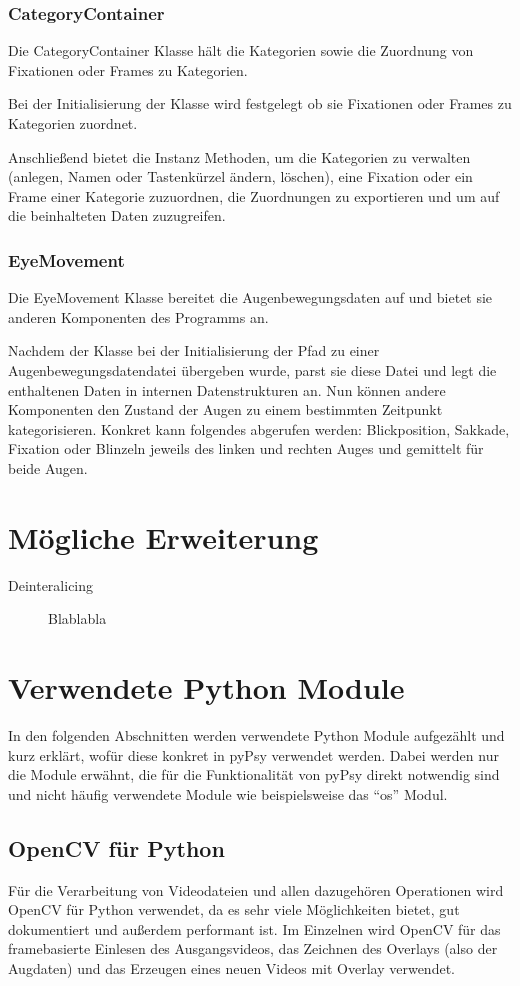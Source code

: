 \documentclass[a4paper,draft]{scrartcl}
\begin{document}
\subsubsection{CategoryContainer}
Die CategoryContainer Klasse hält die Kategorien sowie die Zuordnung von Fixationen oder Frames zu Kategorien.

Bei der Initialisierung der Klasse wird festgelegt ob sie Fixationen oder Frames zu Kategorien zuordnet.

Anschließend bietet die Instanz Methoden, um die Kategorien zu verwalten (anlegen, Namen oder Tastenkürzel ändern, löschen), eine Fixation oder ein Frame einer Kategorie zuzuordnen, die Zuordnungen zu exportieren und um auf die beinhalteten Daten zuzugreifen.

\subsubsection{EyeMovement}
Die EyeMovement Klasse bereitet die Augenbewegungsdaten auf und bietet sie anderen Komponenten des Programms an.

Nachdem der Klasse bei der Initialisierung der Pfad zu einer Augenbewegungsdatendatei übergeben wurde, parst sie diese Datei und legt die enthaltenen Daten in internen Datenstrukturen an. Nun können andere Komponenten den Zustand der Augen zu einem bestimmten Zeitpunkt kategorisieren. Konkret kann folgendes abgerufen werden: Blickposition, Sakkade, Fixation oder Blinzeln jeweils des linken und rechten Auges und gemittelt für beide Augen.

\section{M\"ogliche Erweiterung}
  \begin{description}
    \item[Deinteralicing] Blablabla
  \end{description}

\section{Verwendete Python Module}
In den folgenden Abschnitten werden verwendete Python Module aufgezählt und kurz erklärt, wofür diese konkret in pyPsy verwendet werden. Dabei werden nur die Module erwähnt, die für die Funktionalität von pyPsy direkt notwendig sind und nicht häufig verwendete Module wie beispielsweise das "`os"' Modul. 
\subsection{OpenCV für Python}
Für die Verarbeitung von Videodateien und allen dazugehören Operationen wird OpenCV für Python verwendet, da es sehr viele Möglichkeiten bietet, gut dokumentiert und außerdem performant ist. 
Im Einzelnen wird OpenCV für das framebasierte Einlesen des Ausgangsvideos, das Zeichnen des Overlays (also der Augdaten) und das Erzeugen eines neuen Videos mit Overlay verwendet.
\end{document}

